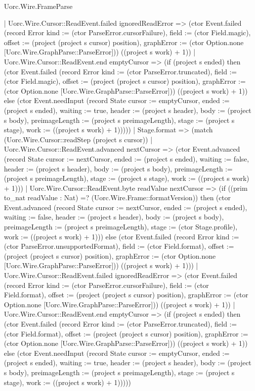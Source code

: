 \begin{lexlean}{Uorc.Wire.FrameParse}
\begin{semanticmodule}
{      | Uorc.Wire.Cursor::ReadEvent.failed ignoredReadError => (ctor Event.failed (record Error {kind := (ctor ParseError.cursorFailure), field := (ctor Field.magic), offset := (project (project s cursor) position), graphError := (ctor Option.none [Uorc.Wire.GraphParse::ParseError])}) ((project s work) + 1))
      | Uorc.Wire.Cursor::ReadEvent.end emptyCursor => (if (project s ended) then (ctor Event.failed (record Error {kind := (ctor ParseError.truncated), field := (ctor Field.magic), offset := (project (project s cursor) position), graphError := (ctor Option.none [Uorc.Wire.GraphParse::ParseError])}) ((project s work) + 1)) else (ctor Event.needInput (record State {cursor := emptyCursor, ended := (project s ended), waiting := true, header := (project s header), body := (project s body), preimageLength := (project s preimageLength), stage := (project s stage), work := ((project s work) + 1)}))))
    | Stage.format => (match (Uorc.Wire.Cursor::readStep (project s cursor))
      | Uorc.Wire.Cursor::ReadEvent.advanced nextCursor => (ctor Event.advanced (record State {cursor := nextCursor, ended := (project s ended), waiting := false, header := (project s header), body := (project s body), preimageLength := (project s preimageLength), stage := (project s stage), work := ((project s work) + 1)}))
      | Uorc.Wire.Cursor::ReadEvent.byte readValue nextCursor => (if ((prim to_nat readValue : Nat) =? (Uorc.Wire.Frame::formatVersion)) then (ctor Event.advanced (record State {cursor := nextCursor, ended := (project s ended), waiting := false, header := (project s header), body := (project s body), preimageLength := (project s preimageLength), stage := (ctor Stage.profile), work := ((project s work) + 1)})) else (ctor Event.failed (record Error {kind := (ctor ParseError.unsupportedFormat), field := (ctor Field.format), offset := (project (project s cursor) position), graphError := (ctor Option.none [Uorc.Wire.GraphParse::ParseError])}) ((project s work) + 1)))
      | Uorc.Wire.Cursor::ReadEvent.failed ignoredReadError => (ctor Event.failed (record Error {kind := (ctor ParseError.cursorFailure), field := (ctor Field.format), offset := (project (project s cursor) position), graphError := (ctor Option.none [Uorc.Wire.GraphParse::ParseError])}) ((project s work) + 1))
      | Uorc.Wire.Cursor::ReadEvent.end emptyCursor => (if (project s ended) then (ctor Event.failed (record Error {kind := (ctor ParseError.truncated), field := (ctor Field.format), offset := (project (project s cursor) position), graphError := (ctor Option.none [Uorc.Wire.GraphParse::ParseError])}) ((project s work) + 1)) else (ctor Event.needInput (record State {cursor := emptyCursor, ended := (project s ended), waiting := true, header := (project s header), body := (project s body), preimageLength := (project s preimageLength), stage := (project s stage), work := ((project s work) + 1)}))))
}
\end{semanticmodule}
\end{lexlean}

